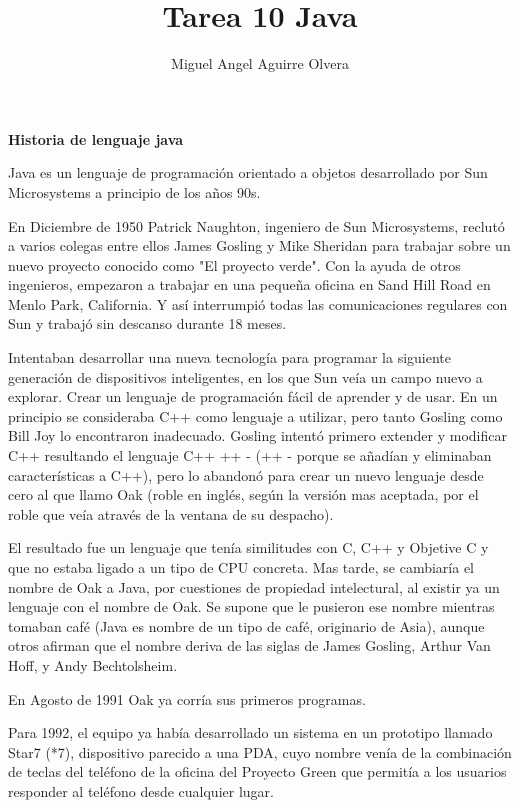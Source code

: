 \documentclass[11pt,a4paper]{article}
\author{Miguel Angel Aguirre Olvera}
\title{Tarea 10 Java }
\begin{document}
\maketitle 
\begin{multicols}{2}
\begin{center}
\textbf{Historia de lenguaje java }
\end{center}
Java es un lenguaje de programación orientado a objetos desarrollado por Sun Microsystems a principio de los años 90s.

En Diciembre de 1950 Patrick Naughton, ingeniero de Sun Microsystems, reclutó a varios colegas entre ellos James Gosling y Mike Sheridan para trabajar sobre un nuevo proyecto conocido como "El proyecto verde".
Con la ayuda de otros ingenieros, empezaron a trabajar en una pequeña oficina en Sand Hill Road en Menlo Park, California. Y así interrumpió todas las comunicaciones regulares con Sun y trabajó sin descanso durante 18 meses.

Intentaban desarrollar una nueva tecnología para programar la siguiente generación de dispositivos inteligentes, en los que Sun veía un campo nuevo a explorar. Crear un lenguaje de programación fácil de aprender y de usar. 
En un principio se consideraba C++ como lenguaje a utilizar, pero tanto Gosling como Bill Joy lo encontraron inadecuado. Gosling intentó primero extender y modificar C++ resultando el lenguaje C++ ++ - (++ - porque se añadían y eliminaban características a C++), pero lo abandonó para crear un nuevo lenguaje desde cero al que llamo Oak (roble en inglés, según la versión mas aceptada, por el roble que veía através de la ventana de su despacho).

El resultado fue un lenguaje que tenía similitudes con C, C++ y Objetive C y que no estaba ligado a un tipo de CPU concreta. 
Mas tarde, se cambiaría el nombre de Oak a Java, por cuestiones de propiedad intelectural, al existir ya un lenguaje con el nombre de Oak. Se supone que le pusieron ese nombre mientras tomaban café (Java es nombre de un tipo de café, originario de Asia), aunque otros afirman que el nombre deriva de las siglas de James Gosling, Arthur Van Hoff, y Andy Bechtolsheim.

En Agosto de 1991 Oak ya corría sus primeros programas.

Para 1992, el equipo ya había desarrollado un sistema en un prototipo llamado Star7 (*7), dispositivo parecido a una PDA, cuyo nombre venía de la combinación de teclas del teléfono de la oficina del Proyecto Green que permitía a los usuarios responder al teléfono desde cualquier lugar.


\end{multicols}
\end{document}

